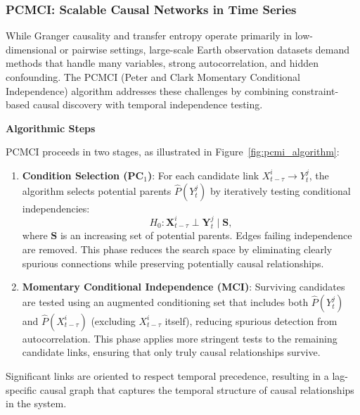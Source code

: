 \subsubsection{PCMCI: Scalable Causal Networks in Time Series}

While Granger causality and transfer entropy operate primarily in low-dimensional or pairwise settings, large-scale Earth observation datasets demand methods that handle many variables, strong autocorrelation, and hidden confounding. The PCMCI (Peter and Clark Momentary Conditional Independence) algorithm \cite{Runge2019} addresses these challenges by combining constraint-based causal discovery with temporal independence testing.

\textbf{Algorithmic Steps}

PCMCI proceeds in two stages, as illustrated in Figure~\ref{fig:pcmi_algorithm}:

\begin{enumerate}
	\item \textbf{Condition Selection (PC$_1$)}: For each candidate link $X_{t-\tau}^i \rightarrow Y_t^j$, the algorithm selects potential parents $\hat{P}(Y_t^j)$ by iteratively testing conditional independencies:
	      \begin{equation}
		      H_0: \mathbf{X}_{t-\tau}^i \perp \mathbf{Y}_t^j \; | \; \mathbf{S},
	      \end{equation}
	      where $\mathbf{S}$ is an increasing set of potential parents. Edges failing independence are removed. This phase reduces the search space by eliminating clearly spurious connections while preserving potentially causal relationships.
	\item \textbf{Momentary Conditional Independence (MCI)}: Surviving candidates are tested using an augmented conditioning set that includes both $\hat{P}(Y_t^j)$ and $\hat{P}(X_{t-\tau}^i)$ (excluding $X_{t-\tau}^i$ itself), reducing spurious detection from autocorrelation. This phase applies more stringent tests to the remaining candidate links, ensuring that only truly causal relationships survive.
\end{enumerate}

Significant links are oriented to respect temporal precedence, resulting in a lag-specific causal graph that captures the temporal structure of causal relationships in the system.

